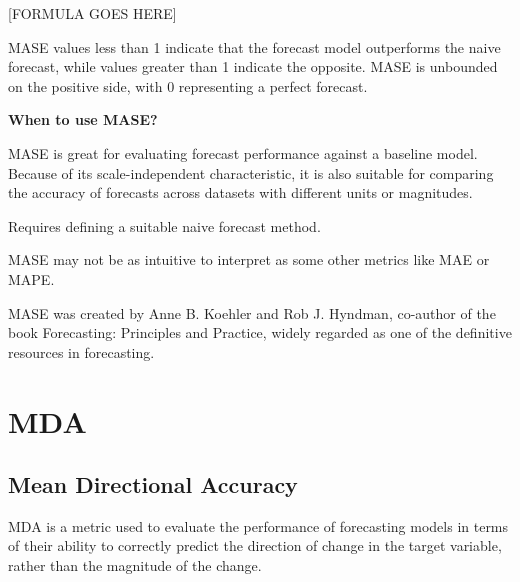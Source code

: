 \begin{center}
    [FORMULA GOES HERE]
\end{center}

MASE values less than 1 indicate that the forecast model outperforms the naive forecast, while values greater than 1 indicate the opposite.
MASE is unbounded on the positive side, with 0 representing a perfect forecast.

\textbf{When to use MASE?}

MASE is great for evaluating forecast performance against a baseline model. Because of its scale-independent characteristic, it is also suitable for comparing the accuracy
of forecasts across datasets with different units or magnitudes.

{
    \item Requires defining a suitable naive forecast method.    
    \item MASE may not be as intuitive to interpret as some other metrics like MAE or MAPE.
}

\clearpage
{}
{MASE was created by Anne B. Koehler and Rob J. Hyndman, co-author of the book Forecasting: Principles and Practice, widely regarded as one of the definitive resources in forecasting.}

\clearpage
\thispagestyle{regressionstyle}
\section{MDA}
\subsection{Mean Directional Accuracy}

MDA is a metric used to evaluate the performance of forecasting models in terms of their ability to correctly predict the direction of change in the target variable,
rather than the magnitude of the change.

